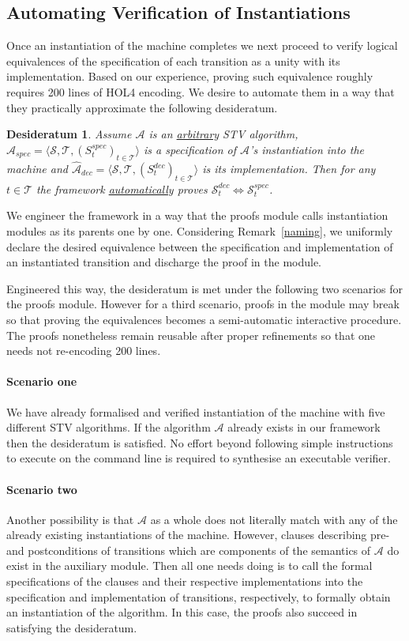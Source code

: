 \documentclass[10pt,conference]{IEEEtran}
\newtheorem{conjecture}{Desideratum}
\begin{document}
\subsection{Automating Verification of Instantiations}  
Once an instantiation of the machine  completes   
 we next proceed to verify logical equivalences of the specification of each transition as a unity with its  implementation. 
Based on our experience, proving  such equivalence  
roughly requires 200 lines of HOL4 encoding. 
We desire to automate them in a way that they practically approximate the following desideratum.    
 \begin{conjecture}\label{conj}
 Assume $\mathcal{A}$ is an \underline{arbitrary} STV algorithm, $\hat{\mathcal{A}}_{spec}= \langle \mathcal{S}, \mathcal{T}, (S_{t}^{spec})_{t \in \mathcal{T}} \rangle$ is a specification of $\mathcal{A}$'s instantiation into the machine and $\hat{\mathcal{A}}_{dec}= \langle \mathcal{S}, \mathcal{T}, (S_{t}^{dec})_{t \in \mathcal{T}} \rangle$ is its implementation. 
  Then for any $t\in\mathcal{T}$ the framework \underline{automatically} proves  $\mathcal{S}_{t}^{dec}\Leftrightarrow\mathcal{S}_{t}^{spec}$. 
 \end{conjecture}
We engineer the framework in a way that the proofs module calls instantiation modules as its parents  one by one.
 Considering Remark~\ref{naming},   we uniformly declare the desired equivalence between the specification and implementation of an instantiated transition and discharge the proof in the  module.


Engineered this way, the desideratum is met under the following two scenarios for the proofs module. However for a third scenario, proofs in the module may break so that proving the equivalences  becomes a semi-automatic interactive procedure. The proofs nonetheless remain reusable after proper refinements so that one needs not re-encoding 200 lines.  
 \paragraph*{Scenario one} We have already formalised and verified instantiation of the machine with five different STV algorithms. If the algorithm $\mathcal{A}$ already exists in our framework then the desideratum is satisfied. No effort beyond following simple instructions to execute on the command line is required to synthesise an executable verifier.  
 \paragraph*{Scenario two} Another possibility is that 
 $\mathcal{A}$ as a whole does not literally match with any of the already existing instantiations of the machine. However, clauses describing pre- and postconditions of transitions which are components of the semantics of $\mathcal{A}$ do exist in the auxiliary module. Then all one needs doing is to call the formal  specifications of the clauses and their respective implementations into the specification and implementation of transitions, respectively,  to formally obtain an instantiation of the algorithm. In this case, the proofs also succeed in satisfying the desideratum. 
\end{document}
